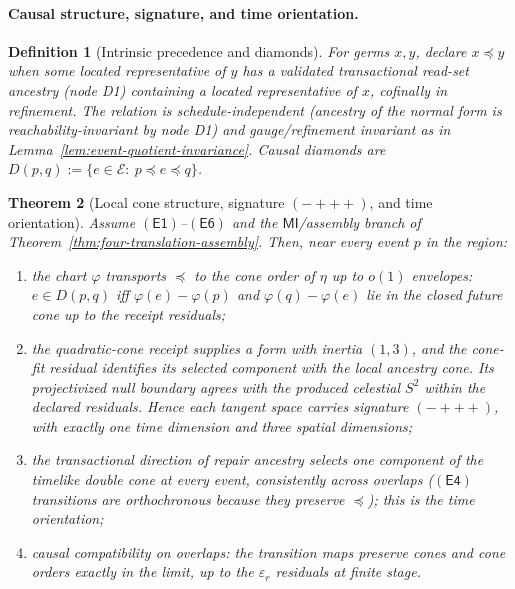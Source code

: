 \documentclass[11pt]{article}
\newtheorem{theorem}{Theorem}[section]
\newtheorem{definition}[theorem]{Definition}
\begin{document}
\paragraph{Causal structure, signature, and time orientation.}

\begin{definition}[Intrinsic precedence and diamonds]
\label{def:intrinsic-precedence}
For germs \(x,y\), declare \(x\preceq y\) when some located representative of
\(y\) has a validated transactional read-set ancestry (node D1) containing a
located representative of \(x\), cofinally in refinement. The relation is
schedule-independent (ancestry of the normal form is
reachability-invariant by node D1) and gauge/refinement invariant as in
Lemma~\ref{lem:event-quotient-invariance}. Causal diamonds are
\(D(p,q):=\{e\in\mathcal E:\ p\preceq e\preceq q\}\).
\end{definition}

\begin{theorem}[Local cone structure, signature \((-{+}{+}{+})\), and time orientation]
\label{thm:event-causal-structure}
Assume \(\mathsf{(E1)}\)--\(\mathsf{(E6)}\) and the
\(\mathsf{MI}\)/assembly branch of
Theorem~\ref{thm:four-translation-assembly}. Then, near every event \(p\) in
the region:
\begin{enumerate}[leftmargin=2em]
\item the chart \(\varphi\) transports \(\preceq\) to the cone order of
\(\eta\) up to \(o(1)\) envelopes: \(e\in D(p,q)\) iff
\(\varphi(e)-\varphi(p)\) and \(\varphi(q)-\varphi(e)\) lie in the closed
future cone up to the receipt residuals;
\item the quadratic-cone receipt supplies a form with inertia \((1,3)\), and
the cone-fit residual identifies its selected component with the local
ancestry cone. Its projectivized null boundary agrees with the produced
celestial \(S^2\) within the declared residuals. Hence each tangent space carries signature
\((-{+}{+}{+})\), with exactly one time dimension and three spatial
dimensions;
\item the transactional direction of repair ancestry selects one component of
the timelike double cone at every event, consistently across overlaps
(\(\mathsf{(E4)}\) transitions are orthochronous because they preserve
\(\preceq\)); this is the time orientation;
\item causal compatibility on overlaps: the transition maps preserve cones
and cone orders exactly in the limit, up to the \(\varepsilon_r\) residuals at
finite stage.
\end{enumerate}
\end{theorem}
\end{document}
